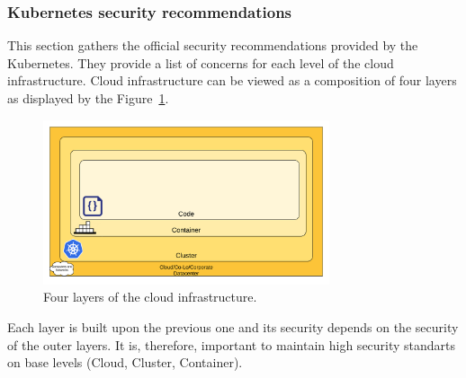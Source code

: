 \subsubsection*{Kubernetes security recommendations}

This section gathers the official security recommendations provided by the Kubernetes. They provide a list of concerns for each level of the cloud infrastructure. Cloud infrastructure can be viewed as a composition of four layers as displayed by the Figure~\ref{img:cloud-security}.

\begin{figure}[!hbt]
	\begin{center}
		\includegraphics[width=0.75\textwidth]{images/cloud-security.png}
        \caption{Four layers of the cloud infrastructure.}
		\label{img:cloud-security}
	\end{center}
\end{figure}

Each layer is built upon the previous one and its security depends on the security of the outer layers. It is, therefore, important to maintain high security standarts on base levels (Cloud, Cluster, Container).


